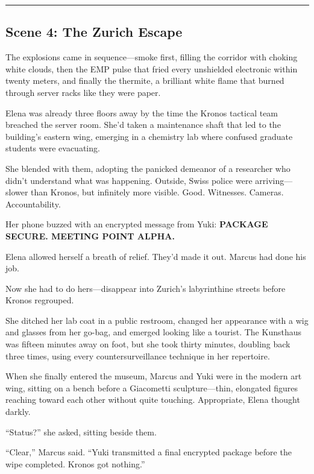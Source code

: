 \begin{center}\rule{0.5\linewidth}{0.5pt}\end{center}

\hypertarget{scene-4-the-zurich-escape}{%
\subsection{Scene 4: The Zurich
Escape}\label{scene-4-the-zurich-escape}}

The explosions came in sequence---smoke first, filling the corridor with
choking white clouds, then the EMP pulse that fried every unshielded
electronic within twenty meters, and finally the thermite, a brilliant
white flame that burned through server racks like they were paper.

Elena was already three floors away by the time the Kronos tactical team
breached the server room. She'd taken a maintenance shaft that led to
the building's eastern wing, emerging in a chemistry lab where confused
graduate students were evacuating.

She blended with them, adopting the panicked demeanor of a researcher
who didn't understand what was happening. Outside, Swiss police were
arriving---slower than Kronos, but infinitely more visible. Good.
Witnesses. Cameras. Accountability.

Her phone buzzed with an encrypted message from Yuki: \textbf{PACKAGE
SECURE. MEETING POINT ALPHA.}

Elena allowed herself a breath of relief. They'd made it out. Marcus had
done his job.

Now she had to do hers---disappear into Zurich's labyrinthine streets
before Kronos regrouped.

She ditched her lab coat in a public restroom, changed her appearance
with a wig and glasses from her go-bag, and emerged looking like a
tourist. The Kunsthaus was fifteen minutes away on foot, but she took
thirty minutes, doubling back three times, using every
countersurveillance technique in her repertoire.

When she finally entered the museum, Marcus and Yuki were in the modern
art wing, sitting on a bench before a Giacometti sculpture---thin,
elongated figures reaching toward each other without quite touching.
Appropriate, Elena thought darkly.

``Status?'' she asked, sitting beside them.

``Clear,'' Marcus said. ``Yuki transmitted a final encrypted package
before the wipe completed. Kronos got nothing.''

